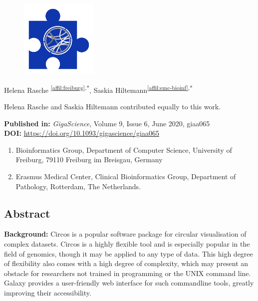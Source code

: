 \setcounter{NAT@ctr}{-1}
\chapter*{}

\begin{figure}[t!]
\centering
\includegraphics[height=10em]{frontmatter/images/chapter-header-circos.png}
\end{figure}
\vspace{-4cm}



Helena Rasche \textsuperscript{\ref{affil:freiburg},*},
Saskia Hiltemann\textsuperscript{\ref{affil:emc-bioinf},*}

{\color{chaptergrey}{*}} Helena Rasche and Saskia Hiltemann contributed equally to this work.

\textbf{Published in:} \emph{GigaScience}, Volume 9, Issue 6, June 2020, giaa065 \\
\textbf{DOI:} \url{https://doi.org/10.1093/gigascience/giaa065}

\small
\begin{enumerate}
 \itemsep-0.5em
 \item Bioinformatics Group, Department of Computer Science, University of Freiburg, 79110 Freiburg im Breisgau, Germany\label{affil:freiburg}
 \item Erasmus Medical Center, Clinical Bioinformatics Group, Department of Pathology, Rotterdam, The Netherlands.\label{affil:emc-bioinf}
\end{enumerate}



\section*{Abstract}

\textbf{Background:} Circos is a popular software package for circular visualisation of complex datasets. Circos is a highly flexible tool and is especially popular in the field of genomics, though it may be applied to any type of data. This high degree of flexibility also comes with a high degree of complexity, which may present an obstacle for researchers not trained in programming or the UNIX command line. Galaxy provides a user-friendly web interface for such commandline tools, greatly improving their accessibility.

